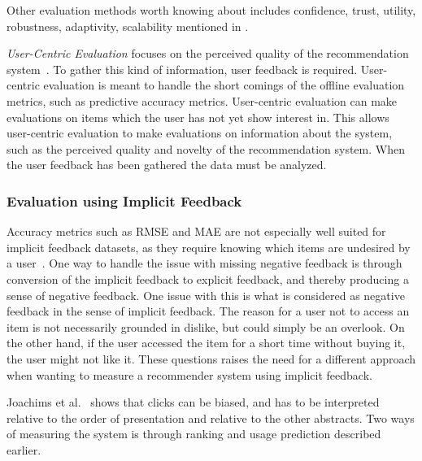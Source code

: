 Other evaluation methods worth knowing about includes confidence, trust,
utility, robustness, adaptivity, scalability mentioned in \cite{Herlocker2004,
Shani2011}.

\textit{User-Centric Evaluation} focuses on the perceived quality of the
recommendation system~\cite{Pu2011}.  To gather this kind of information, user
feedback is required.  User-centric evaluation is meant to handle the short
comings of the offline evaluation metrics, such as predictive accuracy metrics.
User-centric evaluation can make evaluations on items which the user has not
yet show interest in.  This allows user-centric evaluation to make evaluations
on information about the system, such as the perceived quality and novelty of
the recommendation system.  When the user feedback has been gathered the data
must be analyzed.


\subsubsection{Evaluation using Implicit Feedback}

Accuracy metrics such as RMSE and MAE are not especially well suited for
implicit feedback datasets, as they require knowing which items are undesired
by a user~\cite{Hu2008}.  One way to handle the issue with missing negative
feedback is through conversion of the implicit feedback to explicit feedback,
and thereby producing a sense of negative feedback.  One issue with this is
what is considered as negative feedback in the sense of implicit feedback.  The
reason for a user not to access an item is not necessarily grounded in dislike,
but could simply be an overlook.  On the other hand, if the user accessed the
item for a short time without buying it, the user might not like it.  These
questions raises the need for a different approach when wanting to measure a
recommender system using implicit feedback.


Joachims et al.~\cite{Joachims07evaluatingthe} shows that clicks can be biased,
and has to be interpreted relative to the order of presentation and relative to
the other abstracts.  Two ways of measuring the system is through ranking and
usage prediction described earlier.

